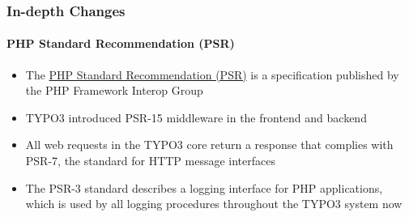 
\begin{frame}[fragile]
	\frametitle{In-depth Changes}
	\framesubtitle{PHP Standard Recommendation (PSR)}

	\begin{itemize}
		\item The
			\href{https://www.php-fig.org/psr/}{PHP Standard Recommendation (PSR)}
			is a specification published by the PHP Framework Interop Group
		\item TYPO3 introduced PSR-15 middleware in the frontend and backend
		\item All web requests in the TYPO3 core return a response that complies
			with PSR-7, the standard for HTTP message interfaces
		\item The PSR-3 standard describes a logging interface for PHP
			applications, which is used by all logging procedures throughout
			the TYPO3 system now
	\end{itemize}

\end{frame}

